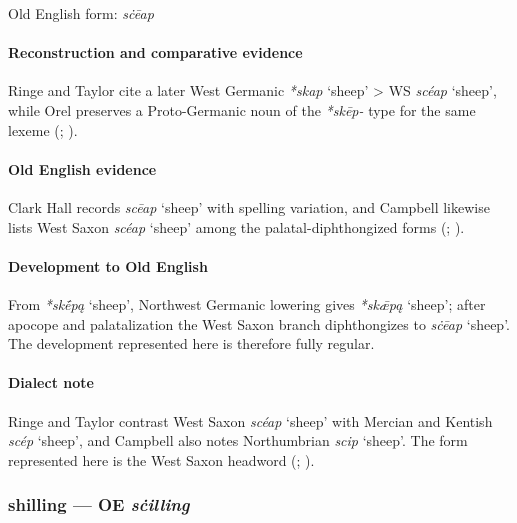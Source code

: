 \documentclass[
  british,
  a4paper,
]{article}
\providecommand{\Recon}[1]{\emph{*#1}}
\begin{document}
Old English form: \emph{sċēap}

\paragraph{Reconstruction and comparative
evidence}\label{reconstruction-and-comparative-evidence-47}

Ringe and Taylor cite a later West Germanic \emph{*skap} `sheep'
\textgreater{} WS \emph{scéap} `sheep', while Orel preserves a
Proto-Germanic noun of the \emph{*skēp-} type for the same lexeme
(;
).

\paragraph{Old English evidence}\label{old-english-evidence-47}

Clark Hall records \emph{scēap} `sheep' with spelling variation, and
Campbell likewise lists West Saxon \emph{scéap} `sheep' among the
palatal-diphthongized forms (; ).

\paragraph{Development to Old
English}\label{development-to-old-english-47}

From \Recon{skḗpą} `sheep', Northwest Germanic lowering gives
\Recon{skǣpą} `sheep'; after apocope and palatalization the West Saxon
branch diphthongizes to \emph{sċēap} `sheep'. The development
represented here is therefore fully regular.

\paragraph{Dialect note}\label{dialect-note-4}

Ringe and Taylor contrast West Saxon \emph{scéap} `sheep' with Mercian
and Kentish \emph{scép} `sheep', and Campbell also notes Northumbrian
\emph{scip} `sheep'. The form represented here is the West Saxon
headword (;
).

\subsubsection{\texorpdfstring{shilling --- OE
\emph{sċilling}}{shilling --- OE sċilling}}\label{shilling-oe-sux10billing}
\end{document}
